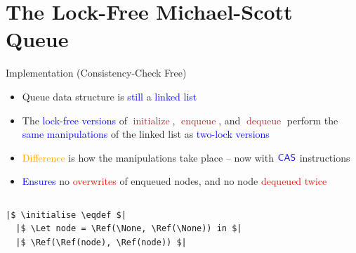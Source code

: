 \documentclass[9pt,xcolor={dvipsnames}]{beamer}
\newcommand{\initialise}{\operatorname{initialize}}
\newcommand{\enqueue}{\operatorname{enqueue}}
\newcommand{\dequeue}{\operatorname{dequeue}}
\begin{document}

\section{The Lock-Free Michael-Scott Queue}

\begin{frame}[fragile]{Implementation (Consistency-Check Free)}
  \begin{itemize}
    \item Queue data structure is \textcolor{blue}{still} a \textcolor{blue}{linked list}
    \item The \textcolor{blue}{lock-free versions} of \textcolor{Brown}{$\initialise$}, \textcolor{Brown}{$\enqueue$}, and \textcolor{Brown}{$\dequeue$} perform the \textcolor{blue}{same manipulations} of the linked list as \textcolor{blue}{two-lock versions}
    \item \textcolor{orange}{Difference} is how the manipulations take place \pause -- now with $\textsf{\color{blue} CAS}$ instructions
    \item \textcolor{blue}{Ensures} no \textcolor{red}{overwrites} of enqueued nodes, and no node \textcolor{red}{dequeued twice}
  \end{itemize}
  \vspace{-12pt}
  \begin{columns}
    \begin{column}{0.5\textwidth}
      \begin{verbatim}
|$ \initialise \eqdef $|
  |$ \Let node = \Ref(\None, \Ref(\None)) in $|
  |$ \Ref(\Ref(node), \Ref(node)) $|


\end{verbatim}
\end{column}
\end{columns}
\end{frame}
\end{document}
